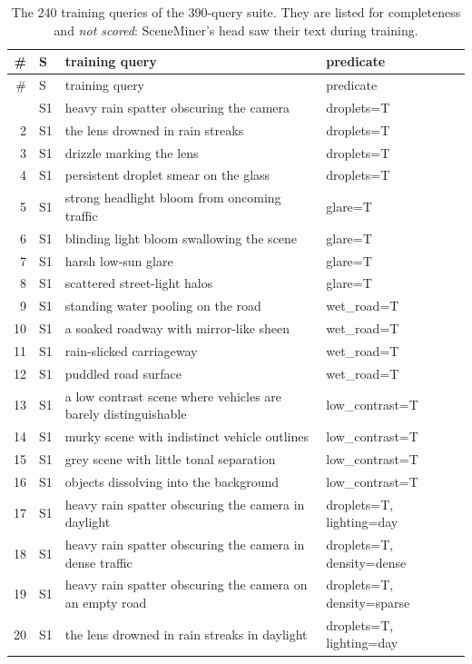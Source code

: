 \begin{longtable}{r l p{8.6cm} p{5.6cm}}
\caption{The 240 training queries of the 390-query suite. They are listed for completeness and \emph{not scored}: SceneMiner's head saw their text during training.}\label{tab:train-q}\\
\toprule
\# & S & training query & predicate\\
\midrule
\endfirsthead
\toprule
\# & S & training query & predicate\\
\midrule
\endhead
\bottomrule
\endfoot
1 & S1 & heavy rain spatter obscuring the camera & droplets=T\\
2 & S1 & the lens drowned in rain streaks & droplets=T\\
3 & S1 & drizzle marking the lens & droplets=T\\
4 & S1 & persistent droplet smear on the glass & droplets=T\\
5 & S1 & strong headlight bloom from oncoming traffic & glare=T\\
6 & S1 & blinding light bloom swallowing the scene & glare=T\\
7 & S1 & harsh low-sun glare & glare=T\\
8 & S1 & scattered street-light halos & glare=T\\
9 & S1 & standing water pooling on the road & wet\_road=T\\
10 & S1 & a soaked roadway with mirror-like sheen & wet\_road=T\\
11 & S1 & rain-slicked carriageway & wet\_road=T\\
12 & S1 & puddled road surface & wet\_road=T\\
13 & S1 & a low contrast scene where vehicles are barely distinguishable & low\_contrast=T\\
14 & S1 & murky scene with indistinct vehicle outlines & low\_contrast=T\\
15 & S1 & grey scene with little tonal separation & low\_contrast=T\\
16 & S1 & objects dissolving into the background & low\_contrast=T\\
17 & S1 & heavy rain spatter obscuring the camera in daylight & droplets=T, lighting=day\\
18 & S1 & heavy rain spatter obscuring the camera in dense traffic & droplets=T, density=dense\\
19 & S1 & heavy rain spatter obscuring the camera on an empty road & droplets=T, density=sparse\\
20 & S1 & the lens drowned in rain streaks in daylight & droplets=T, lighting=day\\

\end{longtable}
